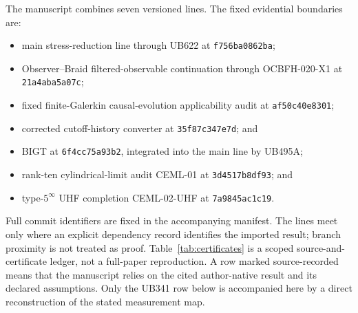 \documentclass[11pt]{article}
\theoremstyle{definition}
\theoremstyle{remark}
\begin{document}
The manuscript combines seven versioned lines. The fixed evidential boundaries are:
\begin{itemize}
 \item main stress-reduction line through UB622 at \texttt{f756ba0862ba};
 \item Observer--Braid filtered-observable continuation through OCBFH-020-X1 at \texttt{21a4aba5a07c};
 \item fixed finite-Galerkin causal-evolution applicability audit at \texttt{af50c40e8301};
 \item corrected cutoff-history converter at \texttt{35f87c347e7d}; and
 \item BIGT at \texttt{6f4cc75a93b2}, integrated into the main line by UB495A;
 \item rank-ten cylindrical-limit audit CEML-01 at \texttt{3d4517b8df93}; and
 \item type-$5^\infty$ UHF completion CEML-02-UHF at \texttt{7a9845ac1c19}.
\end{itemize}
Full commit identifiers are fixed in the accompanying manifest. The lines meet only where an explicit dependency record identifies the imported result; branch proximity is not treated as proof. Table~\ref{tab:certificates} is a scoped source-and-certificate ledger, not a full-paper reproduction. A row marked source-recorded means that the manuscript relies on the cited author-native result and its declared assumptions. Only the UB341 row below is accompanied here by a direct reconstruction of the stated measurement map.
\end{document}
